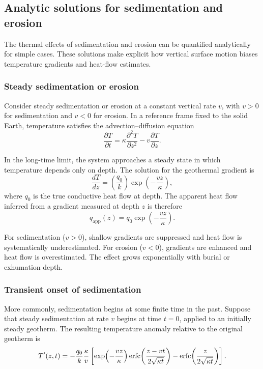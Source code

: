 \subsection{Analytic solutions for sedimentation and erosion}

The thermal effects of sedimentation and erosion can be quantified analytically for simple cases. These solutions make explicit how vertical surface motion biases temperature gradients and heat-flow estimates.

\subsubsection*{Steady sedimentation or erosion}

Consider steady sedimentation or erosion at a constant vertical rate $v$, with $v>0$ for sedimentation and $v<0$ for erosion. In a reference frame fixed to the solid Earth, temperature satisfies the advection--diffusion equation
\begin{equation}
\frac{\partial T}{\partial t}
=
\kappa \frac{\partial^2 T}{\partial z^2}
-
v \frac{\partial T}{\partial z}.
\end{equation}

In the long-time limit, the system approaches a steady state in which temperature depends only on depth. The solution for the geothermal gradient is
\begin{equation}
    \frac{dT}{dz} =
    \left(\frac{q_0}{k}\right) \exp\!\left(-\frac{v z}{\kappa}\right),
\end{equation}
where $q_0$ is the true conductive heat flow at depth. The apparent heat flow inferred from a gradient measured at depth $z$ is therefore
\begin{equation}
    q_{\mathrm{app}}(z) = q_0 \exp\!\left(-\frac{v z}{\kappa}\right).
\end{equation}

For sedimentation ($v>0$), shallow gradients are suppressed and heat flow is systematically underestimated. For erosion ($v<0$), gradients are enhanced and heat flow is overestimated. The effect grows exponentially with burial or exhumation depth.

\subsubsection*{Transient onset of sedimentation}

More commonly, sedimentation begins at some finite time in the past. Suppose that steady sedimentation at rate $v$ begins at time $t=0$, applied to an initially steady geotherm. The resulting temperature anomaly relative to the original geotherm is
\begin{equation}
    T'(z,t) = -\frac{q_0}{k} \frac{\kappa}{v}
    \left[
    \exp\!\left(-\frac{v z}{\kappa}\right)
    \operatorname{erfc}\!\left( \frac{z - v t}{2\sqrt{\kappa t}} \right) -
    \operatorname{erfc} \!\left( \frac{z}{2\sqrt{\kappa t}} \right)
    \right].
\end{equation}

